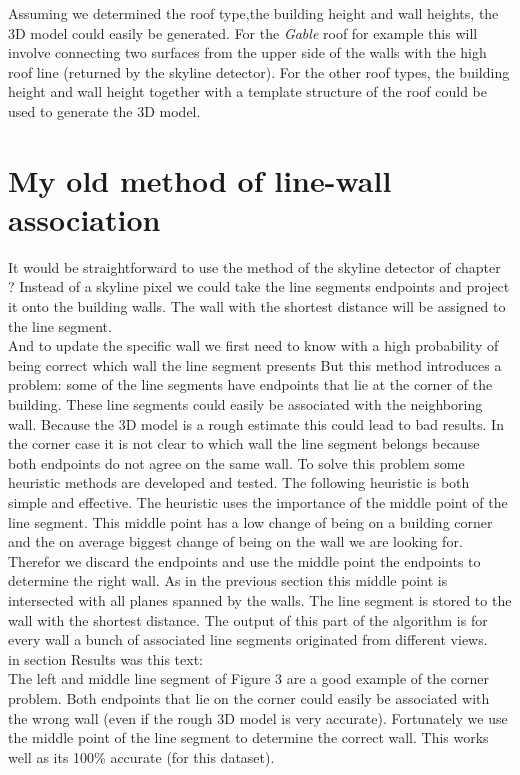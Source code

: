 Assuming we determined the roof type,the building height and wall heights, the 3D model could 
easily be generated. For the \emph{Gable} roof for example this will involve
connecting two surfaces from the upper side of the walls with the high roof line (returned by the
skyline detector). For the other roof types, the building height and wall
height together with a template structure of the roof could be used to generate the 3D
model.


\section{My old method of line-wall association}
It would be straightforward to use the method of the skyline detector of
chapter ?%
Instead of a skyline pixel we could take the line segments
endpoints and project it onto the building walls. The wall with the shortest
distance will be assigned to the line segment.\\

And to update the specific wall we first need to know with a high probability of being correct which wall the line segment presents
But this method introduces a problem: some of the line segments have endpoints that lie at the corner of the building. These line segments could easily be associated with the neighboring wall. Because the 3D model is a rough estimate this could lead to bad results.
In the corner case it is not clear to which wall the line segment belongs because both endpoints do not agree on the same wall. To solve this problem some heuristic methods are developed and tested. The following heuristic is both simple and effective.
The heuristic uses the importance of the middle point of the line segment. This middle point has a low change of being on a building corner and the on average biggest change of being on the wall we are looking for.
Therefor we discard the endpoints and use the middle point the endpoints to determine the right wall.
As in the previous section %
this middle point is intersected with all planes spanned by the walls. The line segment is stored to the wall with the shortest distance.
The output of this part of the algorithm is for every wall a bunch of associated line segments originated from different views.\\

in section Results was this text:\\
The left and middle line segment of Figure 3 %
are
a good example of the corner problem. Both endpoints that lie on the corner could easily be associated
with the wrong wall (even if the rough 3D model is very accurate). Fortunately
we use the middle point of the line segment to determine the correct wall. This
works well as its 100\% accurate (for this dataset).

